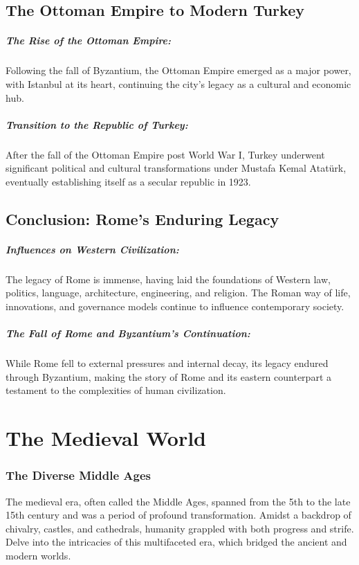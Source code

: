 \documentclass{book}
\begin{document}
\section*{The Ottoman Empire to Modern Turkey}

\paragraph{The Rise of the Ottoman Empire:}
Following the fall of Byzantium, the Ottoman Empire emerged as a major power, with Istanbul at its heart, continuing the city’s legacy as a cultural and economic hub.

\paragraph{Transition to the Republic of Turkey:}
After the fall of the Ottoman Empire post World War I, Turkey underwent significant political and cultural transformations under Mustafa Kemal Atatürk, eventually establishing itself as a secular republic in 1923.

\section*{Conclusion: Rome's Enduring Legacy}

\paragraph{Influences on Western Civilization:}
The legacy of Rome is immense, having laid the foundations of Western law, politics, language, architecture, engineering, and religion. The Roman way of life, innovations, and governance models continue to influence contemporary society.

\paragraph{The Fall of Rome and Byzantium’s Continuation:}
While Rome fell to external pressures and internal decay, its legacy endured through Byzantium, making the story of Rome and its eastern counterpart a testament to the complexities of human civilization.

\chapter{The Medieval World}
\subsection*{The Diverse Middle Ages}
The medieval era, often called the Middle Ages, spanned from the 5th to the late 15th century and was a period of profound transformation. Amidst a backdrop of chivalry, castles, and cathedrals, humanity grappled with both progress and strife. Delve into the intricacies of this multifaceted era, which bridged the ancient and modern worlds.
\end{document}
